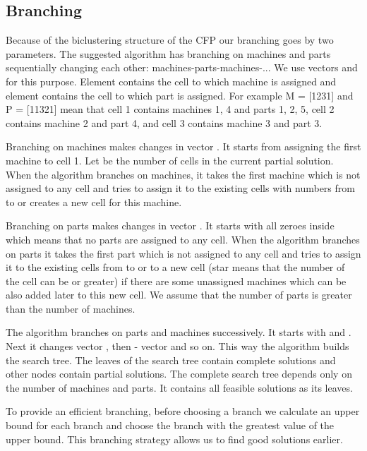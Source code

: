 \documentclass[citeauthoryear]{llncs}
\begin{document}
\subsection{Branching}

Because of the biclustering structure of the CFP our branching goes by two parameters. The suggested algorithm has branching on machines and parts sequentially changing each other: machines-parts-machines-...
We use vectors  and  for this purpose.
Element  contains the cell to which machine  is assigned and element  contains the cell to which part  is assigned.
For example M = [1231] and P = [11321] mean that cell 1 contains machines 1, 4 and parts 1, 2, 5, cell 2 contains machine 2 and part 4, and cell 3 contains machine 3 and part 3.

Branching on machines makes changes in vector . It starts from assigning the first machine to cell 1.
Let  be the number of cells in the current partial solution.
When the algorithm branches on machines, it takes the first machine which is not assigned to any cell and tries to assign it to the existing cells with numbers from  to  or creates a new cell  for this machine.

Branching on parts makes changes in vector . It starts with all zeroes inside  which means that no parts are assigned to any cell. When the algorithm branches on parts it takes the first part which is not assigned to any cell and tries to assign it to the existing cells from  to  or to a new cell  (star means that the number of the cell can be  or greater) if there are some unassigned machines which can be also added later to this new cell. We assume that the number of parts is greater than the number of machines.

The algorithm branches on parts and machines successively. It starts with  and . Next it changes vector , then - vector  and so on. This way the algorithm builds the search tree. The leaves of the search tree contain complete solutions and other nodes contain partial solutions.
The complete search tree depends only on the number of machines and parts. It contains all feasible solutions as its leaves.

To provide an efficient branching, before choosing a branch we calculate an upper bound for each branch and choose the branch with the greatest value of the upper bound. This branching strategy allows us to find good solutions earlier.
\end{document}
